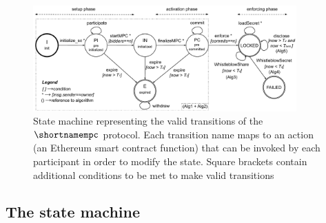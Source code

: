 

\begin{figure}[t]
	\centering
	\includegraphics[width=0.9\textwidth]{fig/protocol_fsm_simple_version.pdf}
	\caption{State machine representing the valid transitions of the $\shortnamempc$ protocol. Each transition name maps to an action (an Ethereum smart contract function) that can be invoked by each participant in order to modify the state. Square brackets contain additional conditions to be met to make valid transitions}
	\label{fig:fsm}
\end{figure}

\subsection{The \shortname state machine}\label{sect:ityt_exec}
 

